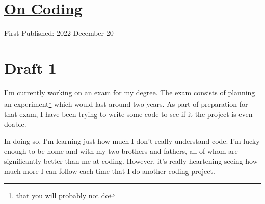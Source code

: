 \documentclass[12pt]{article}[titlepage]
\newcommand{\1}{\={a}}
\newcommand{\2}{\={e}}
\newcommand{\3}{\={\i}}
\newcommand{\4}{\=o}
\newcommand{\5}{\=u}
\newcommand{\6}{\={A}}
\renewcommand{\,}{\textsuperscript{,}}
\begin{document}
\doublespacing
\section{\href{coding.tex}{On Coding}}

First Published: 2022 December 20
\section{Draft 1}
I'm currently working on an exam for my degree.
The exam consists of planning an experiment\footnote{that you will probably not do} which would last around two years.
As part of preparation for that exam, I have been trying to write some code to see if it the project is even doable.

In doing so, I'm learning just how much I don't really understand code.
I'm lucky enough to be home and with my two brothers and fathers, all of whom are significantly better than me at coding.
However, it's really heartening seeing how much more I can follow each time that I do another coding project.
\end{document}

